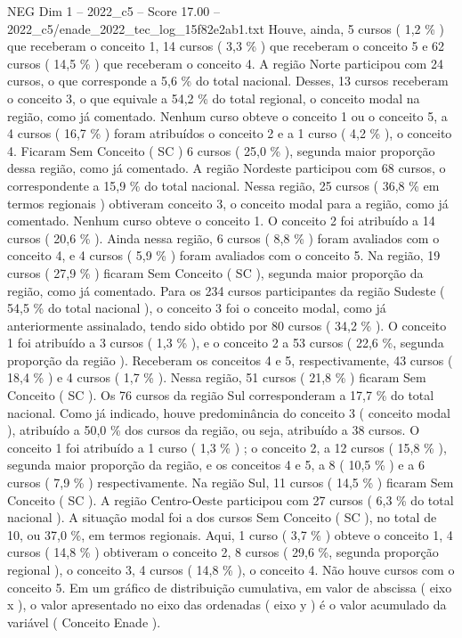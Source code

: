 \begin{textsample}{NEG Dim 1 – 2022\_c5 – Score 17.00 – 2022\_c5/enade\_2022\_tec\_log\_15f82e2ab1.txt}
Houve, ainda, 5 cursos ( 1,2 \% ) que receberam o conceito 1, 14 cursos ( 3,3 \% ) que receberam o conceito 5 e 62 cursos ( 14,5 \% ) que receberam o conceito 4.
A região Norte participou com 24 cursos, o que corresponde a 5,6 \% do total nacional.
Desses, 13 cursos receberam o conceito 3, o que equivale a 54,2 \% do total regional, o conceito modal na região, como já comentado.
Nenhum curso obteve o conceito 1 ou o conceito 5, a 4 cursos ( 16,7 \% ) foram atribuídos o conceito 2 e a 1 curso ( 4,2 \% ), o conceito 4.
Ficaram Sem Conceito ( SC ) 6 cursos ( 25,0 \% ), segunda maior proporção dessa região, como já comentado.
A região Nordeste participou com 68 cursos, o correspondente a 15,9 \% do total nacional.
Nessa região, 25 cursos ( 36,8 \% em termos regionais ) obtiveram conceito 3, o conceito modal para a região, como já comentado.
Nenhum curso obteve o conceito 1.
O conceito 2 foi atribuído a 14 cursos ( 20,6 \% ).
Ainda nessa região, 6 cursos ( 8,8 \% ) foram avaliados com o conceito 4, e 4 cursos ( 5,9 \% ) foram avaliados com o conceito 5.
Na região, 19 cursos ( 27,9 \% ) ficaram Sem Conceito ( SC ), segunda maior proporção da região, como já comentado.
Para os 234 cursos participantes da região Sudeste ( 54,5 \% do total nacional ), o conceito 3 foi o conceito modal, como já anteriormente assinalado, tendo sido obtido por 80 cursos ( 34,2 \% ).
O conceito 1 foi atribuído a 3 cursos ( 1,3 \% ), e o conceito 2 a 53 cursos ( 22,6 \%, segunda proporção da região ).
Receberam os conceitos 4 e 5, respectivamente, 43 cursos ( 18,4 \% ) e 4 cursos ( 1,7 \% ).
Nessa região, 51 cursos ( 21,8 \% ) ficaram Sem Conceito ( SC ).
Os 76 cursos da região Sul corresponderam a 17,7 \% do total nacional.
Como já indicado, houve predominância do conceito 3 ( conceito modal ), atribuído a 50,0 \% dos cursos da região, ou seja, atribuído a 38 cursos.
O conceito 1 foi atribuído a 1 curso ( 1,3 \% ) ; o conceito 2, a 12 cursos ( 15,8 \% ), segunda maior proporção da região, e os conceitos 4 e 5, a 8 ( 10,5 \% ) e a 6 cursos ( 7,9 \% ) respectivamente.
Na região Sul, 11 cursos ( 14,5 \% ) ficaram Sem Conceito ( SC ).
A região Centro-Oeste participou com 27 cursos ( 6,3 \% do total nacional ).
A situação modal foi a dos cursos Sem Conceito ( SC ), no total de 10, ou 37,0 \%, em termos regionais.
Aqui, 1 curso ( 3,7 \% ) obteve o conceito 1, 4 cursos ( 14,8 \% ) obtiveram o conceito 2, 8 cursos ( 29,6 \%, segunda proporção regional ), o conceito 3, 4 cursos ( 14,8 \% ), o conceito 4.
Não houve cursos com o conceito 5.
Em um gráfico de distribuição cumulativa, em valor de abscissa ( eixo x ), o valor apresentado no eixo das ordenadas ( eixo y ) é o valor acumulado da variável ( Conceito Enade ).

\end{textsample}
